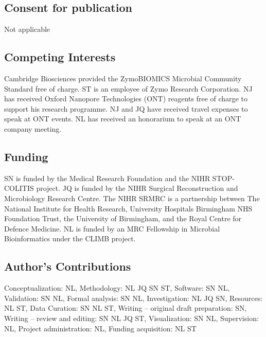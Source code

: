 \documentclass[a4paper,num-refs]{oup-contemporary}
\begin{document}

\subsection{Consent for publication}
Not applicable

\subsection{Competing Interests}
Cambridge Biosciences provided the ZymoBIOMICS Microbial Community Standard free of charge.
ST is an employee of Zymo Research Corporation.
NJ has received Oxford Nanopore Technologies (ONT) reagents free of charge to support his research programme.
NJ and JQ have received travel expenses to speak at ONT events.
NL has received an honorarium to speak at an ONT company meeting.

\subsection{Funding}
SN is funded by the Medical Research Foundation and the NIHR STOP-COLITIS project.
JQ is funded by the NIHR Surgical Reconstruction and Microbiology Research Centre. 
The NIHR SRMRC is a partnership between The National Institute for Health Research, University Hospitals Birmingham NHS Foundation Trust, the University of Birmingham, and the Royal Centre for Defence Medicine.
NL is funded by an MRC Fellowship in Microbial Bioinformatics under the CLIMB project.

\subsection{Author's Contributions}
Conceptualization: NL, Methodology: NL JQ SN ST, Software: SN NL, Validation: SN NL, Formal analysis: SN NL, Investigation: NL JQ SN, Resources: NL ST, Data Curation: SN NL ST, Writing – original draft preparation: SN, Writing – review and editing: SN NL JQ ST, Visualization: SN NL, Supervision: NL, Project administration: NL, Funding acquisition: NL ST

\end{document}

